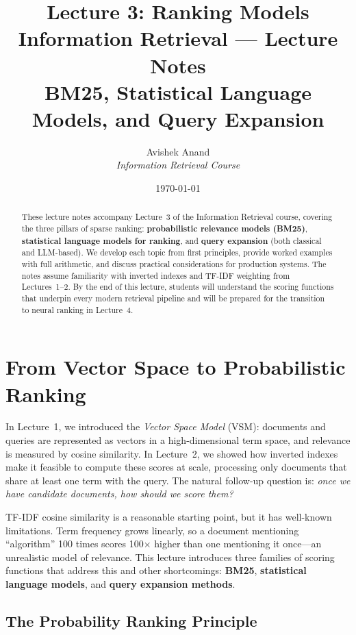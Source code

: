 \documentclass[11pt,a4paper]{article}
\title{\textbf{Lecture 3: Ranking Models}\\[0.5em]\Large Information Retrieval --- Lecture Notes\\[0.3em]\normalsize BM25, Statistical Language Models, and Query Expansion}
\author{Avishek Anand\\\textit{Information Retrieval Course}}
\date{\today}
\theoremstyle{definition}
\theoremstyle{plain}
\begin{document}
\maketitle

\begin{abstract}
These lecture notes accompany Lecture~3 of the Information Retrieval course, covering the three pillars of sparse ranking: \textbf{probabilistic relevance models (BM25)}, \textbf{statistical language models for ranking}, and \textbf{query expansion} (both classical and LLM-based). We develop each topic from first principles, provide worked examples with full arithmetic, and discuss practical considerations for production systems. The notes assume familiarity with inverted indexes and TF-IDF weighting from Lectures~1--2. By the end of this lecture, students will understand the scoring functions that underpin every modern retrieval pipeline and will be prepared for the transition to neural ranking in Lecture~4.
\end{abstract}

\tableofcontents
\newpage

\section{From Vector Space to Probabilistic Ranking}
\label{sec:motivation}

In Lecture~1, we introduced the \emph{Vector Space Model} (VSM): documents and queries are represented as vectors in a high-dimensional term space, and relevance is measured by cosine similarity. In Lecture~2, we showed how inverted indexes make it feasible to compute these scores at scale, processing only documents that share at least one term with the query. The natural follow-up question is: \textit{once we have candidate documents, how should we score them?}

TF-IDF cosine similarity is a reasonable starting point, but it has well-known limitations. Term frequency grows linearly, so a document mentioning ``algorithm'' 100 times scores 100$\times$ higher than one mentioning it once---an unrealistic model of relevance. This lecture introduces three families of scoring functions that address this and other shortcomings: \textbf{BM25}, \textbf{statistical language models}, and \textbf{query expansion methods}.

\subsection{The Probability Ranking Principle}
\end{document}
